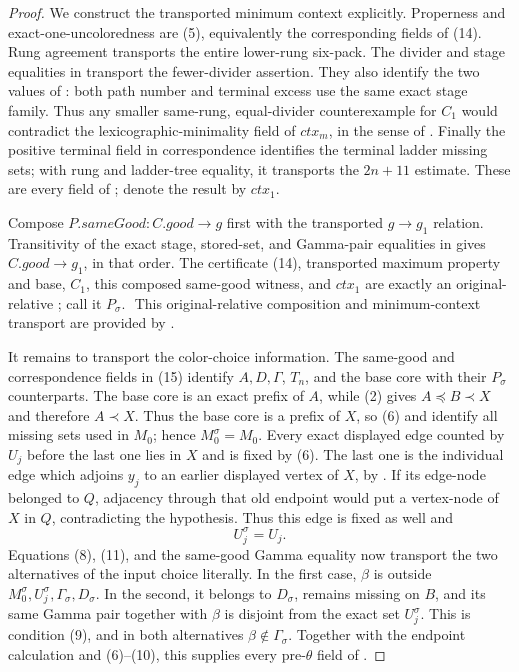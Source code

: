 \begin{proof}
We construct the transported minimum context explicitly.  Properness
and exact-one-uncoloredness are (5), equivalently the corresponding
fields of (14).  Rung agreement transports the entire lower-rung
six-pack.  The divider and stage equalities in
 transport the fewer-divider assertion.
They also identify the two values of
: both path number and terminal
excess use the same exact stage family.  Thus any smaller same-rung,
equal-divider counterexample for \(C_1\) would contradict the
lexicographic-minimality field of \(\mathit{ctx}_m\), in the sense of
.  Finally the positive terminal
 field in correspondence identifies the terminal
ladder missing sets; with rung and ladder-tree equality, it transports
the \(2n+11\) estimate.  These are every field of
; denote the result by
\(\mathit{ctx}_1\).

Compose \(P.\mathit{sameGood}:C.\mathit{good}\to g\) first with the
transported \(g\to g_1\) relation.  Transitivity of the exact stage,
stored-set, and Gamma-pair equalities in
 gives \(C.\mathit{good}\to g_1\), in that
order.  The certificate (14), transported maximum property and base,
\(C_1\), this composed same-good witness, and \(\mathit{ctx}_1\) are
exactly an original-relative
; call it \(P_\sigma\).    \(\tag{15}\)
This original-relative composition and minimum-context transport are
provided by .

It remains to transport the color-choice information.  The same-good
and correspondence fields in (15) identify \(A,D,\Gamma\), \(T_n\), and
the base core with their \(P_\sigma\) counterparts.  The base core is an
exact prefix of \(A\), while (2) gives \(A\preccurlyeq B\prec X\) and
therefore \(A\prec X\).  Thus the base core is a prefix of \(X\), so (6) and
 identify all missing sets used in
\(M_0\); hence \(M_0^\sigma=M_0\).  Every exact displayed edge counted by
\(U_j\) before the last one lies in \(X\) and is fixed by (6).  The last
one is the individual edge which adjoins \(y_j\) to an earlier displayed
vertex of \(X\), by .  If its edge-node belonged
to \(Q\), adjacency through that old endpoint would put a vertex-node of
\(X\) in \(Q\), contradicting the hypothesis.  Thus this edge is fixed
as well and
\[
                         U_j^\sigma=U_j.                       \tag{16}
\]
Equations (8), (11), and the same-good Gamma equality now transport the
two alternatives of the input choice literally.  In the first case,
\(\beta\) is outside \(M_0^\sigma,U_j^\sigma,\Gamma_\sigma,D_\sigma\).
In the second, it belongs to \(D_\sigma\), remains missing on \(B\), and
its same Gamma pair together with \(\beta\) is disjoint from the exact
set \(U_j^\sigma\).  This is condition (9), and in both alternatives
\(\beta\notin\Gamma_\sigma\).  Together with the endpoint calculation
and (6)--(10), this supplies every pre-\(\theta\) field of
.


\end{proof}
